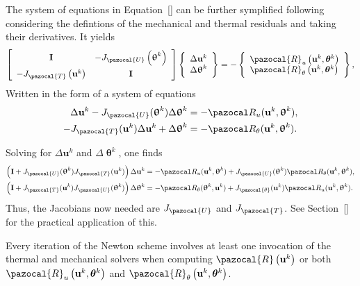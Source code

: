 The system of equations in Equation~\eqref{} can be further symplified following \cite{degroote_development_2010} considering the defintions of the mechanical and thermal residuals and taking their derivatives.
It yields
\begin{equation}
\left[\begin{array}{cc}
\mathbf I & -J_{\pazocal{U}}\left(\bm{\uptheta}^{k}\right) \\[7pt] 
-J_{\pazocal{T}}\left(\mathbf{u}^{k}\right) & \mathbf I
\end{array}\right]
\left\{\begin{array}{c}\Delta \mathbf{u}^{k} \\ \Delta \bm{\uptheta}^{k}\end{array}\right\}
=-\left\{\begin{array}{l}\pazocal{R}_{u}\left(\mathbf{u}^{k}, \boldsymbol{\theta}^{k}\right) \\ \pazocal{R}_{\theta}\left(\mathbf{u}^{k}, \boldsymbol{\theta}^{k}\right)\end{array}\right\},
\end{equation}
Written in the form of a system of equations
\begin{align}
  \Delta \mathbf u^k - J_\pazocal{U}(\bm \uptheta^k) \Delta \bm\uptheta^k &= - \pazocal R_u(\mathbf u^k, \bm \uptheta^k),\\
  - J_\pazocal{T}(\mathbf u^k) \Delta \mathbf u^k + \Delta \bm\uptheta^k &= - \pazocal R_\theta(\mathbf u^k, \bm \uptheta^k).
\end{align}

Solving for \(\Delta \mathbf u^k\) and \(\Delta \bm \uptheta^k\), one finds
\begin{align}
  \left(\mathbf I + J_\pazocal{U}(\bm\uptheta^k)J_\pazocal{T}(\mathbf u^k)\right)\Delta \mathbf u^k &= - \pazocal R_u(\mathbf u^k, \bm \uptheta^k)+J_\pazocal{U}(\bm\uptheta^k)\pazocal R_\theta(\mathbf u^k, \bm\uptheta^k), \label{eq:explicit_eq_delta_u_newton}\\
  \left(\mathbf I + J_\pazocal{T}(\mathbf u^k)J_\pazocal{U}(\bm\uptheta^k)\right)\Delta \bm\uptheta^k &= - \pazocal R_\theta(\bm \uptheta^k, \mathbf u^k)+J_\pazocal{\theta}(\mathbf u^k)\pazocal R_u(\mathbf u^k, \bm\uptheta^k). \label{eq:explicit_eq_delta_theta_newton}
\end{align}
Thus, the Jacobians now needed are \(J_\pazocal{U}\) and \(J_\pazocal{T}\).
See Section~\ref{} for the practical application of this.

Every iteration of the Newton scheme involves at least one invocation of the thermal and mechanical solvers when computing $\pazocal{R}\left(\mathbf{u}^{k}\right)$ or both $\pazocal{R}_{u}\left(\mathbf{u}^{k}, \boldsymbol{\theta}^{k}\right)$ and $\pazocal{R}_{\theta}\left(\mathbf{u}^{k}, \boldsymbol{\theta}^{k}\right)$.

